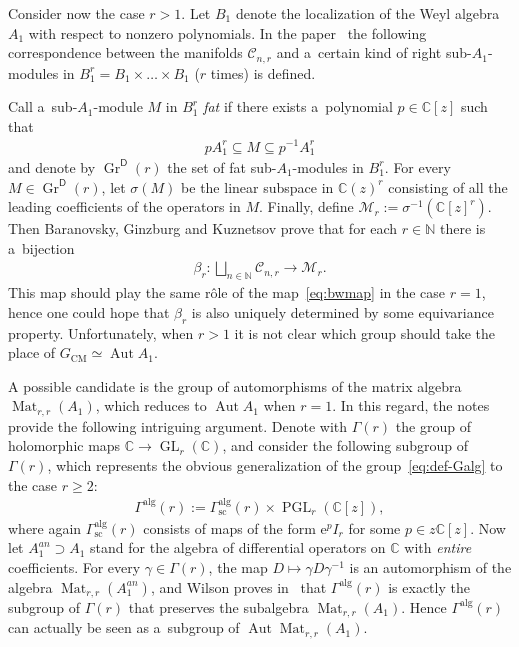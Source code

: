 \documentclass[pdftex]{sigma}
\newcommand{\bb}[1]{\mathbb{#1}}
\newcommand{\app}[3]{#1\colon #2\to #3}
\DeclareMathOperator{\GL}{GL}
\DeclareMathOperator{\PGL}{PGL}
\DeclareMathOperator{\Mat}{Mat}
\DeclareMathOperator{\Aut}{Aut}
\DeclareMathOperator{\Gr}{Gr}
\begin{document}
Consider now the case \(r>1\).
Let \(B_{1}\) denote the localization of the Weyl algebra \(A_{1}\) with respect to nonzero polynomials.
In the paper~\cite{bgk02} the following correspondence between the manifolds \(\mathcal{C}_{n,r}\) and
a~certain kind of right sub-\(A_{1}\)-modules in \(B_{1}^{r} = B_{1}\times \dots \times B_{1}\) (\(r\)
times) is def\/ined.

Call a~sub-\(A_{1}\)-module \(M\) in \(B_{1}^{r}\) \emph{fat} if there exists a~polynomial \(p\in
\bb{C}[z]\) such that
\begin{gather*}
pA_{1}^{r}\subseteq M\subseteq p^{-1}A_{1}^{r}
\end{gather*}
and denote by \(\Gr^{\mathsf{D}}(r)\) the set of fat sub-\(A_{1}\)-modules in \(B_{1}^{r}\).
For every \(M\in \Gr^{\mathsf{D}}(r)\), let \(\sigma(M)\) be the linear subspace in \(\bb{C}(z)^{r}\)
consisting of all the leading coef\/f\/icients of the operators in \(M\).
Finally, def\/ine \(\mathcal{M}_{r}\mathrel{:=} \sigma^{-1}(\bb{C}[z]^{r})\).
Then Baranovsky, Ginzburg and Kuznetsov prove that for each \(r\in \bb{N}\) there is a~bijection
\begin{gather*}
\app{\beta_{r}}{\bigsqcup_{n\in\bb{N}}\mathcal{C}_{n,r}}{\mathcal{M}_{r}}.
\end{gather*}
This map should play the same r\^ole of the map~\eqref{eq:bwmap} in the case \(r=1\), hence one could hope
that \(\beta_{r}\) is also uniquely determined by some equivariance property.
Unfortunately, when \(r>1\) it is not clear which group should take the place of \(G_{\mathrm{CM}}\simeq
\Aut A_{1}\).

A possible candidate is the group of automorphisms of the matrix algebra \(\Mat_{r,r}(A_{1})\), which
reduces to \(\Aut A_{1}\) when \(r=1\).
In this regard, the notes~\cite{wils09} provide the following intriguing argument.
Denote with \(\Gamma(r)\) the group of holomorphic maps \(\bb{C}\to \GL_{r}(\bb{C})\), and consider the
following subgroup of \(\Gamma(r)\), which represents the obvious generalization of the
group~\eqref{eq:def-Galg} to the case \(r\geq 2\):
\begin{gather*}
\Gamma^{\mathrm{alg}}(r)\mathrel{:=}\Gamma^{\mathrm{alg}}_{\text{sc}}(r)\times\PGL_{r}(\bb{C}[z]),
\end{gather*}
where again \(\Gamma^{\mathrm{alg}}_{\mathrm{sc}}(r)\) consists of maps of the form \(\mathrm{e}^{p}I_{r}\)
for some \(p\in z\bb{C}[z]\).
Now let \(A_{1}^{an}\supset A_{1}\) stand for the algebra of dif\/ferential operators on \(\bb{C}\) with
\emph{entire} coef\/f\/icients.
For every \(\gamma\in \Gamma(r)\), the map \(D\mapsto \gamma D\gamma^{-1}\) is an automorphism of the
algebra \(\Mat_{r,r}(A_{1}^{an})\), and Wilson proves in~\cite{wils09} that \(\Gamma^{\mathrm{alg}}(r)\) is
exactly the subgroup of \(\Gamma(r)\) that preserves the subalgebra \(\Mat_{r,r}(A_{1})\).
Hence \(\Gamma^{\mathrm{alg}}(r)\) can actually be seen as a~subgroup of \(\Aut \Mat_{r,r}(A_{1})\).
\end{document}
